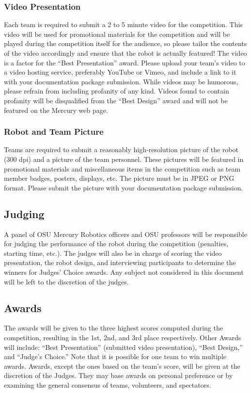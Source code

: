 \subsubsection{Video Presentation}
Each team is required to submit a 2 to 5 minute video for the competition. This video will be used for promotional materials for the competition and will be played during the competition itself for the audience, so please tailor the contents of the video accordingly and ensure that the robot is actually featured! The video is a factor for the “Best Presentation” award. Please upload your team’s video to a video hosting service, preferably YouTube or Vimeo, and include a link to it with your documentation package submission. While videos may be humorous, please refrain from including profanity of any kind. Videos found to contain profanity will be disqualified from the ``Best Design'' award and will not be featured on the Mercury web page.

\subsubsection{Robot and Team Picture}
Teams are required to submit a reasonably high-resolution picture of the robot (300 dpi) and a picture of the team personnel. These pictures will be featured in promotional materials and miscellaneous items in the competition such as team member badges, posters, displays, etc. The picture must be in JPEG or PNG format. Please submit the picture with your documentation package submission.

\subsection{Judging}
A panel of OSU Mercury Robotics officers and OSU professors will be responsible for judging the performance of the robot during the competition (penalties, starting time, etc.). The judges will also be in charge of scoring the video presentation, the robot design, and interviewing participants to determine the winners for Judges’ Choice awards. 
Any subject not considered in this document will be left to the discretion of the judges.

\subsection{Awards}
The awards will be given to the three highest scores computed during the competition, resulting in the 1st, 2nd, and 3rd place respectively. Other Awards will include: “Best Presentation” (submitted video presentation), “Best Design,” and “Judge's Choice.” Note that it is possible for one team to win multiple awards. 
Awards, except the ones based on the team’s score, will be given at the discretion of the Judges. They may base awards on personal preference or by examining the general consensus of teams, volunteers, and spectators. 